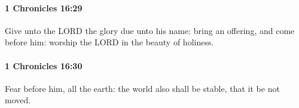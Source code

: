 		\paragraph{1 Chronicles 16:29} %
			\label{1CHRONICLES-16-29}

			Give unto the LORD the glory due unto his name: bring an offering, and come before him: worship the LORD in the beauty of holiness.


		\paragraph{1 Chronicles 16:30} %
			\label{1CHRONICLES-16-30}

			Fear before him, all the earth: the world also shall be stable, that it be not moved.


